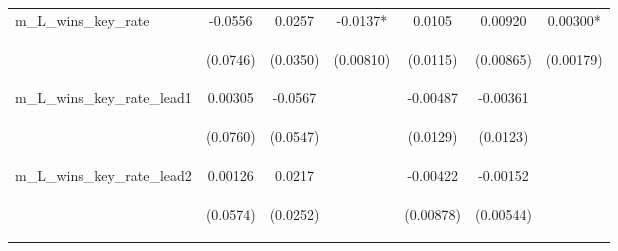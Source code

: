 \documentclass[]{article}
\begin{document}
\begin{center}
\begin{tabular}{lcccccc}
m\_L\_wins\_key\_rate & -0.0556 & 0.0257 & -0.0137* & 0.0105 & 0.00920 & 0.00300* \\
\vspace{4pt} & \begin{footnotesize}(0.0746)\end{footnotesize} & \begin{footnotesize}(0.0350)\end{footnotesize} & \begin{footnotesize}(0.00810)\end{footnotesize} & \begin{footnotesize}(0.0115)\end{footnotesize} & \begin{footnotesize}(0.00865)\end{footnotesize} & \begin{footnotesize}(0.00179)\end{footnotesize} \\
m\_L\_wins\_key\_rate\_lead1 & 0.00305 & -0.0567 &  & -0.00487 & -0.00361 &  \\
\vspace{4pt} & \begin{footnotesize}(0.0760)\end{footnotesize} & \begin{footnotesize}(0.0547)\end{footnotesize} & \begin{footnotesize}\end{footnotesize} & \begin{footnotesize}(0.0129)\end{footnotesize} & \begin{footnotesize}(0.0123)\end{footnotesize} & \begin{footnotesize}\end{footnotesize} \\
m\_L\_wins\_key\_rate\_lead2 & 0.00126 & 0.0217 &  & -0.00422 & -0.00152 &  \\
\vspace{4pt} & \begin{footnotesize}(0.0574)\end{footnotesize} & \begin{footnotesize}(0.0252)\end{footnotesize} & \begin{footnotesize}\end{footnotesize} & \begin{footnotesize}(0.00878)\end{footnotesize} & \begin{footnotesize}(0.00544)\end{footnotesize} & \begin{footnotesize}\end{footnotesize} \\

\end{tabular}
\end{center}
\end{document}
